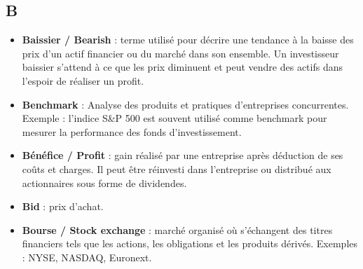 \documentclass[a4paper,10pt]{article}
\begin{document}
\begin{multicols}{2}
\section*{B}
\begin{itemize}
  \item \textbf{Baissier / Bearish} : terme utilisé pour décrire une tendance à la baisse des prix d’un actif financier ou du marché dans son ensemble. Un investisseur baissier s’attend à ce que les prix diminuent et peut vendre des actifs dans l’espoir de réaliser un profit.
  \item \textbf{Benchmark} : Analyse des produits et pratiques d'entreprises concurrentes. Exemple : l'indice S\&P 500 est souvent utilisé comme benchmark pour mesurer la performance des fonds d'investissement.
  \item \textbf{Bénéfice / Profit} : gain réalisé par une entreprise après déduction de ses coûts et charges. Il peut être réinvesti dans l’entreprise ou distribué aux actionnaires sous forme de dividendes.
  \item \textbf{Bid} : prix d'achat.
  \item \textbf{Bourse / Stock exchange} : marché organisé où s’échangent des titres financiers tels que les actions, les obligations et les produits dérivés. Exemples : NYSE, NASDAQ, Euronext.
\end{itemize}


\end{multicols}
\end{document}
